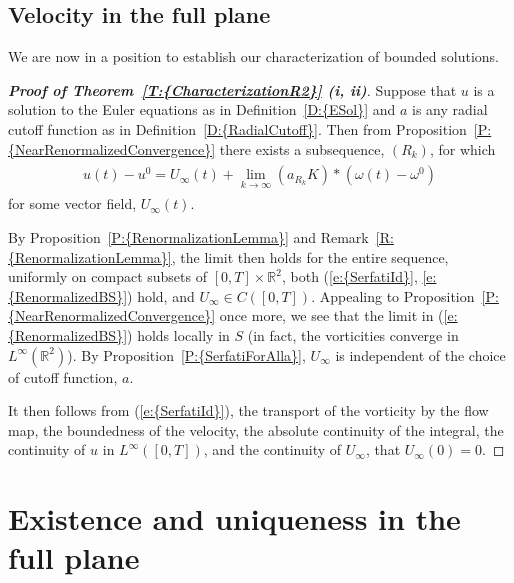 \documentclass[reqno,openright,11pt,twoside]{amsart}
\theoremstyle{definition}
\numberwithin{equation}{section}
\begin{document}
\subsection{Velocity in the full plane}\label{S:CharacterizationR2}

\noindent We are now in a position to establish our characterization of bounded solutions.

\begin{proof}[\textbf{Proof of {Theorem~\ref{T:{CharacterizationR2}}} (i, ii)}]
	Suppose that $u$ is a solution to the Euler equations
	as in {Definition~\ref{D:{ESol}}}
	and $a$ is any radial cutoff function as in {Definition~\ref{D:{RadialCutoff}}}.
	Then from {Proposition~\ref{P:{NearRenormalizedConvergence}}} there exists
	a subsequence, $(R_k)$, for which
	\begin{align*} 
		\begin{split}
			u(t) - u^0
				= U_{\ensuremath{\infty}}(t)
				+ 
					\lim_{k \to {\ensuremath{\infty}}} (a_{R_k} K) *
						(\omega(t) - \omega^0)
		\end{split}
	\end{align*}
	for some vector field, $U_{\ensuremath{\infty}}(t)$.
	
	By {Proposition~\ref{P:{RenormalizationLemma}}} and {Remark~\ref{R:{RenormalizationLemma}}},
	the limit then holds for the entire sequence,
	uniformly on compact subsets of $[0, T] \times {\ensuremath{{\ensuremath{\mathbb{{R}}}}}}^2$,
	both {(\ref{e:{SerfatiId}}, \ref{e:{RenormalizedBS}})} hold, and $U_{\ensuremath{\infty}} \in C([0, T])$.
	Appealing to {Proposition~\ref{P:{NearRenormalizedConvergence}}} once more, we see that the limit in
	{(\ref{e:{RenormalizedBS}})} holds locally in $S$ (in fact, the vorticities converge in
	$L^{\ensuremath{\infty}}({\ensuremath{{\ensuremath{\mathbb{{R}}}}}}^2)$).
	By {Proposition~\ref{P:{SerfatiForAlla}}}, $U_{\ensuremath{\infty}}$ is independent of the choice of cutoff function, $a$.
	
	It then follows from {(\ref{e:{SerfatiId}})}, the transport of the vorticity by the flow map, the boundedness
	of the velocity, the absolute continuity of the integral, the continuity of $u$ in $L^{\ensuremath{\infty}}([0, T])$,
	and the continuity of $U_{\ensuremath{\infty}}$,
	that $U_{\ensuremath{\infty}}(0) = 0$.
\end{proof}

{} 
	

\section{Existence and uniqueness in the full plane}\label{S:ExistenceR2}
\end{document}
